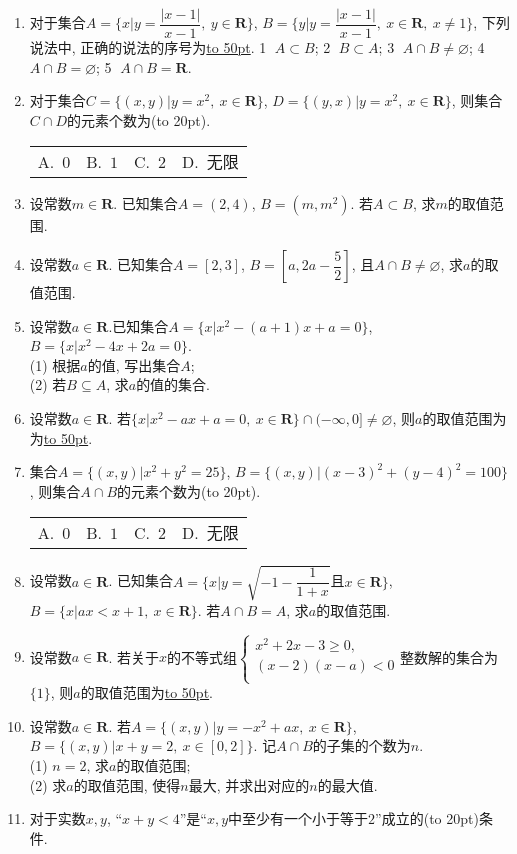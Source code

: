 \documentclass[10pt,a4paper]{article}
\newcommand{\blank}[1]{\underline{\hbox to #1pt{}}}
\newcommand{\bracket}[1]{(\hbox to #1pt{})}
\newcommand{\fourch}[4]{\par\begin{tabular}{p{.23\textwidth}p{.23\textwidth}p{.23\textwidth}p{.23\textwidth}}
A.~#1 &B.~#2& C.~#3& D.~#4
\end{tabular}}
\begin{document}
\begin{enumerate}[1.]
\item 对于集合$A=\{x|y=\dfrac{|x-1|}{x-1}, \ y\in \mathbf{R}\}$, $B=\{y|y=\dfrac{|x-1|}{x-1},\ x\in \mathbf{R},\ x\ne 1\}$, 下列说法中, 正确的说法的序号为\blank{50}.
\textcircled{1} $A\subset B$; \textcircled{2} $B\subset A$; \textcircled{3} $A\cap B\ne \varnothing$; \textcircled{4} $A\cap B=\varnothing$; \textcircled{5} $A\cap B=\mathbf{R}$.
\item 对于集合$C=\{(x,y)|y=x^2,\ x\in \mathbf{R}\}$, $D=\{(y,x)|y=x^2,\ x\in \mathbf{R}\}$, 则集合$C\cap D$的元素个数为\bracket{20}.
\fourch{$0$}{$1$}{$2$}{无限}
\item 设常数$m\in \mathbf{R}$. 已知集合$A=(2, 4)$, $B=(m, m^2)$. 若$A\subset B$, 求$m$的取值范围.
\item 设常数$a\in \mathbf{R}$. 已知集合$A=[2, 3]$, $B=[a, 2a-\dfrac 52]$, 且$A\cap B\ne \varnothing$, 求$a$的取值范围.
\item 设常数$a\in \mathbf{R}$.已知集合$A=\{x|x^2-(a+1)x+a=0\}$, $B=\{x|x^2-4x+2a=0\}$.\\
(1) 根据$a$的值, 写出集合$A$;\\
(2) 若$B\subseteq A$, 求$a$的值的集合.
\item 设常数$a\in \mathbf{R}$. 若$\{x|x^2-ax+a=0,\ x\in \mathbf{R}\}\cap  (-\infty , 0]\ne \varnothing$, 则$a$的取值范围为为\blank{50}.
\item 集合$A=\{(x,y)|x^2+y^2=25\}$, $B=\{(x,y)|(x-3)^2+(y-4)^2=100\}$, 则集合$A\cap B$的元素个数为\bracket{20}.
\fourch{$0$}{$1$}{$2$}{无限}
\item 设常数$a\in \mathbf{R}$. 已知集合$A=\{x|y=\sqrt {-1-\dfrac 1{1+x}}$且$x\in \mathbf{R}\}$, $B=\{x| ax<x+1, \ x\in \mathbf{R}\}$. 若$A\cap B=A$, 求$a$的取值范围.
\item 设常数$a\in \mathbf{R}$. 若关于$x$的不等式组$\begin{cases} x^2+2x-3\ge 0, \\  (x-2)(x-a)<0 \\ \end{cases}$整数解的集合为$\{1\}$, 则$a$的取值范围为\blank{50}.
\item 设常数$a\in \mathbf{R}$. 若$A=\{(x,y)|y=-x^2+ax, \ x\in \mathbf{R}\}$, $B=\{(x,y)|x+y=2,\ x\in [0,2]\}$. 记$A\cap B$的子集的个数为$n$.\\
(1) $n=2$, 求$a$的取值范围;\\
(2) 求$a$的取值范围, 使得$n$最大, 并求出对应的$n$的最大值.
\item 对于实数$x,y$, ``$x+y<4$''是``$x,y$中至少有一个小于等于$2$''成立的\bracket{20}条件.

\end{enumerate}
\end{document}
